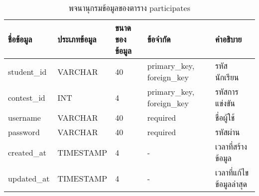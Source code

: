 \begin{table}[H]
    \caption{พจนานุกรมข้อมูลของตาราง participates}
    \label{tab:database-participates}
    \begin{tabularx}{\textwidth}{ | p{2.25cm} | p{2.20cm} | p{2.45cm} | p{2.15cm} | X | }
    \hline
    \textbf{ชื่อข้อมูล} & \textbf{ประเภทข้อมูล} & \textbf{ขนาดของข้อมูล} & \textbf{ข้อจำกัด} & \textbf{คำอธิบาย} \\
    \hline
    student\_id & VARCHAR & 40 & primary\_key, foreign\_key & รหัสนักเรียน \\
    \hline
    contest\_id & INT & 4 & primary\_key, foreign\_key & รหัสการแข่งขัน \\
    \hline
    username & VARCHAR & 40 & required & ชื่อผู้ใช้ \\
    \hline
    password & VARCHAR & 40 & required & รหัสผ่าน \\
    \hline
    created\_at & TIMESTAMP & 4 & - & เวลาที่สร้างข้อมูล \\
    \hline
    updated\_at & TIMESTAMP & 4 & - & เวลาที่แก้ไขข้อมูลล่าสุด \\
    \hline
    \end{tabularx}
\end{table}
